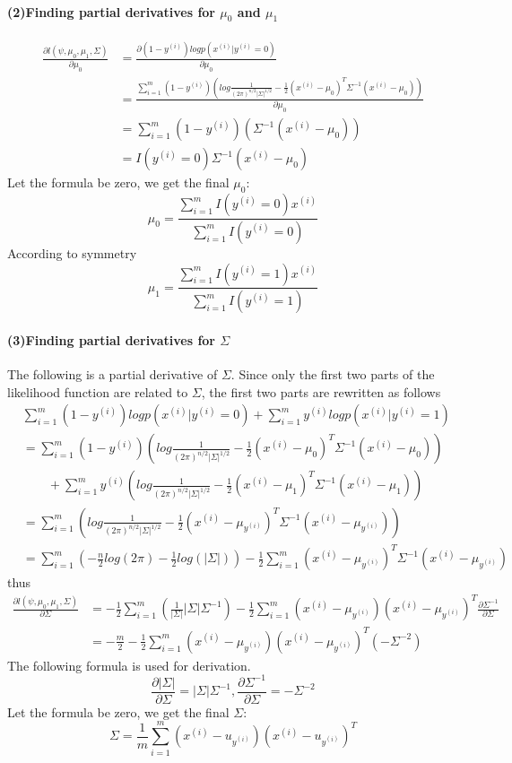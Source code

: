 \documentclass[UTF8]{article}
\begin{document}
\paragraph{(2)Finding partial derivatives for $\mu_0$ and $\mu_1$}
\begin{align*}
  \frac{\partial l(\psi,\mu_0,\mu_1,\Sigma)}{\partial \mu_0}
  &=\frac{\partial(1-y^{(i)})logp(x^{(i)}|y^{(i)}=0)}{\partial \mu_0}\\
  &=\frac{\sum_{i=1}^m(1-y^{(i)})\left(log\frac{1}{(2\pi)^{n/2}|\Sigma|^{1/2}}-\frac{1}{2}(x^{(i)}-\mu_0)^T\Sigma^{-1}(x^{(i)}-\mu_0)\right)}{\partial \mu_0} \\
  &=\sum_{i=1}^m(1-y^{(i)})(\Sigma^{-1}(x^{(i)}-\mu_0)) \\
  &=I(y^{(i)}=0)\Sigma^{-1}(x^{(i)}-\mu_0)
\end{align*}
Let the formula be zero, we get the final $\mu_0$:
$$\mu_0 = \frac{\sum_{i=1}^mI(y^{(i)}=0)x^{(i)}}{\sum_{i=1}^mI(y^{(i)}=0)}
$$
According to symmetry
$$\mu_1 = \frac{\sum_{i=1}^mI(y^{(i)}=1)x^{(i)}}{\sum_{i=1}^mI(y^{(i)}=1)}
$$

\paragraph{(3)Finding partial derivatives for $\Sigma$}
The following is a partial derivative of $\Sigma$. Since only the first two parts of the likelihood function are related to $\Sigma$, the first two parts are rewritten as follows
\begin{align*}
  &\sum_{i=1}^m(1-y^{(i)})logp(x^{(i)}|y^{(i)}=0) + \sum_{i=1}^my^{(i)}logp(x^{(i)}|y^{(i)}=1) \\
  &=\sum_{i=1}^m(1-y^{(i)})\left(log\frac{1}{(2\pi)^{n/2}|\Sigma|^{1/2}}-\frac{1}{2}(x^{(i)}-\mu_0)^T\Sigma^{-1}(x^{(i)}-\mu_0)\right) \\
& \qquad+ \sum_{i=1}^my^{(i)}\left(log\frac{1}{(2\pi)^{n/2}|\Sigma|^{1/2}}-\frac{1}{2}(x^{(i)}-\mu_1)^T\Sigma^{-1}(x^{(i)}-\mu_1)\right) \\
&=\sum_{i=1}^m\left(log\frac{1}{(2\pi)^{n/2}|\Sigma|^{1/2}}-\frac{1}{2}(x^{(i)}-\mu_{y^{(i)}})^T\Sigma^{-1}(x^{(i)}-\mu_{y^{(i)}})  \right)\\
&=\sum_{i=1}^m\left(-\frac{n}{2}log(2\pi)-\frac{1}{2}log(|\Sigma|)\right)-\frac{1}{2}\sum_{i=1}^m(x^{(i)}-\mu_{y^{(i)}})^T\Sigma^{-1}(x^{(i)}-\mu_{y^{(i)}})
\end{align*}
thus
\begin{align*}
  \frac{\partial l(\psi,\mu_0,\mu_1,\Sigma)}{\partial \Sigma} &=
-\frac{1}{2}\sum_{i=1}^m(\frac{1}{|\Sigma|}|\Sigma|\Sigma^{-1})-\frac{1}{2}\sum_{i=1}^m(x^{(i)}-\mu_{y^{(i)}})(x^{(i)}-\mu_{y^{(i)}})^T\frac{\partial\Sigma^{-1}}{\partial\Sigma} \\
&=-\frac{m}{2}-\frac{1}{2}\sum_{i=1}^m(x^{(i)}-\mu_{y^{(i)}})(x^{(i)}-\mu_{y^{(i)}})^T(-\Sigma^{-2})
\end{align*}
The following formula is used for derivation.
$$
\frac{\partial|\Sigma|}{\partial\Sigma}=|\Sigma|\Sigma^{-1},
\frac{\partial\Sigma^{-1}}{\partial\Sigma}=-\Sigma^{-2}
$$
Let the formula be zero, we get the final $\Sigma$:
$$
\Sigma=\frac{1}{m}\sum_{i=1}^m(x^{(i)}-u_{y^{(i)}})(x^{(i)}-u_{y^{(i)}})^T
$$
\end{document}

